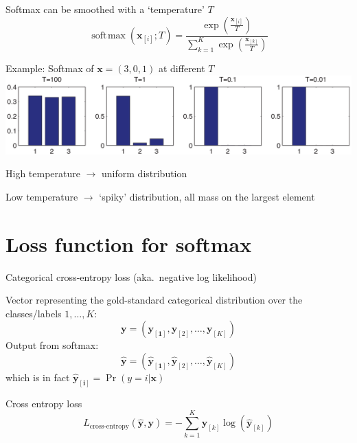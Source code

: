 \documentclass[12pt,aspectratio=169,handout]{beamer}
\DeclareMathOperator*{\softmax}{soft\!\max}
\begin{document}
\begin{frame}{Softmax can be smoothed with a `temperature' $T$}
\vspace{-1em}
$$
\softmax (\bm{x}_{[i]}; T) = \frac{
	\exp(\frac{\bm{x}_{[i]}}{T})
}{
	\sum_{k=1}^{K} \exp(
	\frac{\bm{x}_{[k]}}{T})
}
$$

\pause
\begin{block}{Example: Softmax of $\bm{x} = (3, 0, 1)$ at different $T$}
\includegraphics[width=0.95\linewidth]{img/temperatures.png}

High temperature $\to$ uniform distribution

Low temperature $\to$ `spiky' distribution, all mass on the largest element

\end{block}


	
\end{frame}


\section{Loss function for softmax}

\begin{frame}{Categorical cross-entropy loss (aka.\ negative log likelihood)}

Vector representing the gold-standard categorical distribution over the classes/labels $1, \ldots, K$:
$$
\bm{y} = (\bm{y_{[1]}}, \bm{y}_{[2]}, \ldots, \bm{y}_{[K]})
$$
Output from softmax:
$$
\bm{\hat{y}} = (\bm{\hat{y}_{[1]}}, \bm{\hat{y}}_{[2]}, \ldots, \bm{\hat{y}}_{[K]})
$$
which is in fact $\bm{\hat{y}_{[i]}} = \Pr(y = i| \bm{x})$
	
	
\begin{block}{Cross entropy loss}
$$
L_{\text{cross-entropy}} (\bm{\hat{y}, \bm{y}}) =
- \sum_{k = 1}^{K} \bm{y}_{[k]} \log \left(  \bm{\hat{y}}_{[k]} \right)
$$	
\end{block}	
\end{frame}
\end{document}
